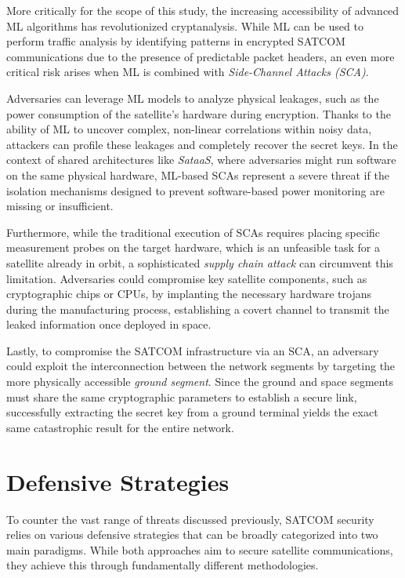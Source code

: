 \documentclass[11pt,a4paper]{report}
\begin{document}
More critically for the scope of this study, the increasing accessibility of advanced ML algorithms has revolutionized cryptanalysis. 
While ML can be used to perform traffic analysis by identifying patterns in encrypted SATCOM communications due to the presence of predictable packet headers, 
an even more critical risk arises when ML is combined with \textit{Side-Channel Attacks (SCA)}. 

Adversaries can leverage ML models to analyze physical leakages, such as the power consumption of the satellite's hardware during encryption. 
Thanks to the ability of ML to uncover complex, non-linear correlations within noisy data, attackers can profile these leakages and completely recover the secret keys. 
In the context of shared architectures like \textit{SataaS}, where adversaries might run software on the same physical hardware, 
ML-based SCAs represent a severe threat if the isolation mechanisms designed to prevent software-based power monitoring are missing or insufficient.

Furthermore, while the traditional execution of SCAs requires placing specific measurement probes on the target hardware, which is an unfeasible task for a satellite already in orbit, 
a sophisticated \textit{supply chain attack} can circumvent this limitation. 
Adversaries could compromise key satellite components, such as cryptographic chips or CPUs, by implanting the necessary hardware trojans during the manufacturing process, 
establishing a covert channel to transmit the leaked information once deployed in space.

Lastly, to compromise the SATCOM infrastructure via an SCA, an adversary could exploit the interconnection between the network segments by targeting the more physically accessible \textit{ground segment}. 
Since the ground and space segments must share the same cryptographic parameters to establish a secure link, 
successfully extracting the secret key from a ground terminal yields the exact same catastrophic result for the entire network.

\section{Defensive Strategies}
To counter the vast range of threats discussed previously, SATCOM security relies on various defensive strategies that can be broadly categorized into two main paradigms. 
While both approaches aim to secure satellite communications, they achieve this through fundamentally different methodologies.
\end{document}
